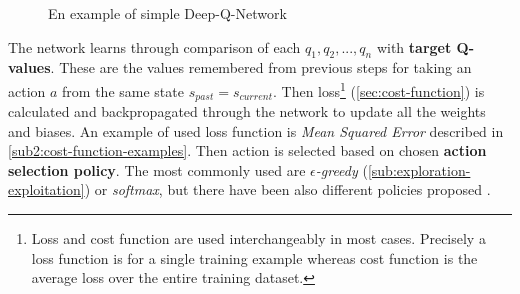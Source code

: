 \vspace{1cm}

\begin{figure}[h]
\centering
{}
\caption{En example of simple Deep-Q-Network}
\label{fig:deep-q-network}
\end{figure}

The network learns through comparison of each $q_1, q_2, ..., q_n$ with \textbf{target Q-values}. These are the values remembered from previous steps for taking an action $a$ from the same state $s_{past} = s_{current}$. Then loss\footnote{Loss and cost function are used interchangeably in most cases. Precisely a loss function is for a single training example whereas cost function is the average loss over the entire training dataset.} (\ref{sec:cost-function}) is calculated and backpropagated through the network to update all the weights and biases. An example of used loss function is \emph{Mean Squared Error} described in \ref{sub2:cost-function-examples}. Then action is selected based on chosen \textbf{action selection policy}. The most commonly used are \emph{$\epsilon$-greedy} (\ref{sub:exploration-exploitation}) or \emph{softmax}, but there have been also different policies proposed \cite{AdaptiveEGreedy}.

